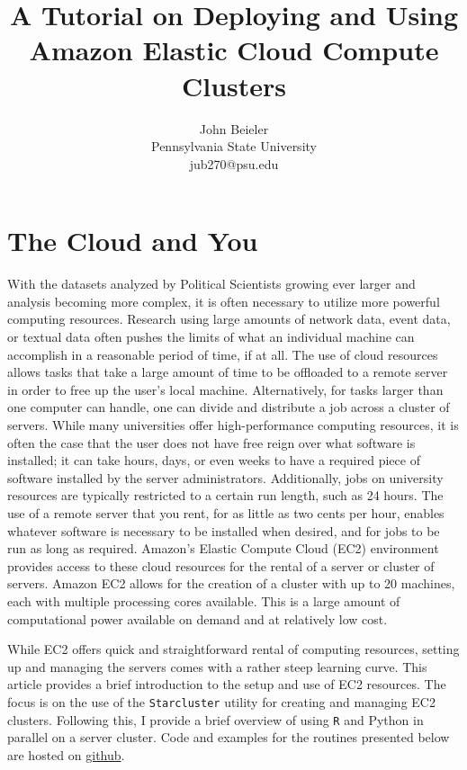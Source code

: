 \documentclass[12pt, letterpaper]{article}
\title{A Tutorial on Deploying and Using Amazon Elastic Cloud Compute Clusters}
\author{John Beieler\\Pennsylvania State University\\jub270@psu.edu}
\begin{document}
 
\maketitle 

\newpage

\section*{The Cloud and You} 

With the datasets analyzed by Political Scientists growing ever larger and analysis
becoming more complex, it is often necessary to utilize more powerful computing resources. 
Research using large amounts of network data, event data, or textual data often
pushes the limits of what an individual machine can accomplish in a reasonable period of time, if at
all. The use of cloud resources allows tasks that take a large amount of time to be offloaded to a remote server in order to free up
the user's local machine. Alternatively, for tasks larger than one computer can handle, one can divide and distribute a job across a cluster of servers. 
While many universities offer high-performance computing resources, it is often the case that the user does not have
free reign over what software is installed; it can take hours, days, or 
even weeks to have a required piece of software installed by the server administrators. Additionally, jobs
on university resources are typically restricted to a certain run length, such as
24 hours. The use of a remote server that you rent, for as little as two cents per hour,
enables whatever software is necessary to be installed when desired, and for jobs to be run as long as required.
Amazon's Elastic Compute Cloud (EC2) environment provides access to these cloud resources
for the rental of a server or cluster of servers. Amazon EC2 allows
for the creation of a cluster with up to 20 machines, each with 
multiple processing cores available. This is a large amount of computational power 
available on demand and at relatively low cost. 
 
While EC2 offers quick and straightforward rental of computing resources, setting up and managing the 
servers comes with a rather steep learning curve. This article provides
a brief introduction to the setup and use of EC2 resources. The focus is 
on the use of the \texttt{Starcluster} utility for creating and managing EC2 
clusters. Following this, I provide a 
brief overview of using \texttt{R} and Python in parallel on a server cluster. Code and examples
for the routines presented below are hosted on \href{https://github.com/johnb30/polmeth_ec2}{github}.
\end{document}

